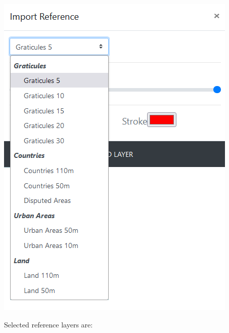 \documentclass[
  letterpaper,
  DIV=11,
  numbers=noendperiod]{scrreprt}
\begin{document}
\begin{center}
\includegraphics{images/Geo_Add_reference_layer.png}
\end{center}

Selected reference layers are:
\end{document}
